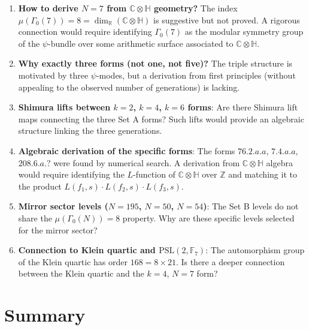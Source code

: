 \documentclass[12pt]{article}
\theoremstyle{definition}
\theoremstyle{remark}
\begin{document}
\begin{enumerate}
  \item \textbf{How to derive $N = 7$ from $\mathbb{C}\otimes\mathbb{H}$ geometry?}
    The index $\mu(\Gamma_0(7)) = 8 = \dim_{\mathbb{R}}(\mathbb{C}\otimes\mathbb{H})$
    is suggestive but not proved.  A rigorous connection would require identifying
    $\Gamma_0(7)$ as the modular symmetry group of the $\psi$-bundle over some
    arithmetic surface associated to $\mathbb{C}\otimes\mathbb{H}$.

  \item \textbf{Why exactly three forms (not one, not five)?}
    The triple structure is motivated by three $\psi$-modes, but a derivation
    from first principles (without appealing to the observed number of generations)
    is lacking.

  \item \textbf{Shimura lifts between $k = 2$, $k = 4$, $k = 6$ forms}:
    Are there Shimura lift maps connecting the three Set A forms?
    Such lifts would provide an algebraic structure linking the three generations.

  \item \textbf{Algebraic derivation of the specific forms}:
    The forms $76.2.a.a$, $7.4.a.a$, $208.6.a.?$ were found by numerical search.
    A derivation from $\mathbb{C}\otimes\mathbb{H}$ algebra would require identifying
    the $L$-function of $\mathbb{C}\otimes\mathbb{H}$ over $\mathbb{Z}$ and matching
    it to the product $L(f_1, s) \cdot L(f_2, s) \cdot L(f_3, s)$.

  \item \textbf{Mirror sector levels ($N = 195$, $N = 50$, $N = 54$)}:
    The Set B levels do not share the $\mu(\Gamma_0(N)) = 8$ property.
    Why are these specific levels selected for the mirror sector?

  \item \textbf{Connection to Klein quartic and $\mathrm{PSL}(2, \mathbb{F}_7)$}:
    The automorphism group of the Klein quartic has order $168 = 8 \times 21$.
    Is there a deeper connection between the Klein quartic and the $k=4$, $N=7$ form?
\end{enumerate}

\section{Summary}
\end{document}
